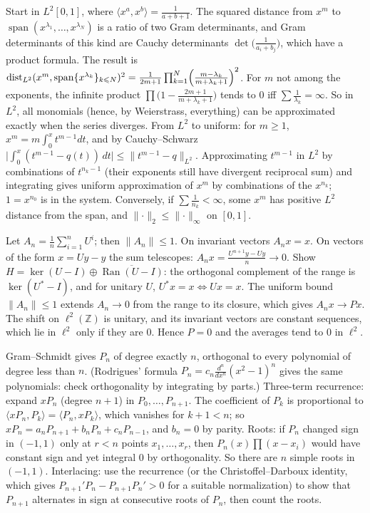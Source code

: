 \documentclass[11pt,a4paper]{article}
\begin{document}
Start in \(L^2[0,1]\), where \(\langle x^a,x^b\rangle=\frac1{a+b+1}\). The squared distance from \(x^m\) to \(\operatorname{span}(x^{\lambda_1},\dots,x^{\lambda_N})\) is a ratio of two Gram determinants, and Gram determinants of this kind are Cauchy determinants \(\det\bigl(\frac1{a_i+b_j}\bigr)\), which have a product formula.
The result is \(\operatorname{dist}_{L^2}(x^m,\operatorname{span}\{x^{\lambda_k}\}_{k\le N})^2=\frac1{2m+1}\prod_{k=1}^N\Bigl(\frac{m-\lambda_k}{m+\lambda_k+1}\Bigr)^2\). For \(m\) not among the exponents, the infinite product \(\prod\bigl(1-\frac{2m+1}{m+\lambda_k+1}\bigr)\) tends to \(0\) iff \(\sum\frac1{\lambda_k}=\infty\). So in \(L^2\), all monomials (hence, by Weierstrass, everything) can be approximated exactly when the series diverges.
From \(L^2\) to uniform: for \(m\ge1\), \(x^m=m\int_0^xt^{m-1}dt\), and by Cauchy--Schwarz \(\bigl\lvert\int_0^x(t^{m-1}-q(t))\,dt\bigr\rvert\le\lVert t^{m-1}-q\rVert_{L^2}\). Approximating \(t^{m-1}\) in \(L^2\) by combinations of \(t^{n_k-1}\) (their exponents still have divergent reciprocal sum) and integrating gives uniform approximation of \(x^m\) by combinations of the \(x^{n_k}\); \(1=x^{n_0}\) is in the system. Conversely, if \(\sum\frac1{n_k}\lt\infty\), some \(x^m\) has positive \(L^2\) distance from the span, and \(\lVert\cdot\rVert_2\le\lVert\cdot\rVert_\infty\) on \([0,1]\).

Let \(A_n=\frac1n\sum_{i=1}^nU^i\); then \(\lVert A_n\rVert\le1\). On invariant vectors \(A_nx=x\). On vectors of the form \(x=Uy-y\) the sum telescopes: \(A_nx=\frac{U^{n+1}y-Uy}n\to0\).
Show \(H=\ker(U-I)\oplus\overline{\operatorname{Ran}(U-I)}\): the orthogonal complement of the range is \(\ker(U^*-I)\), and for unitary \(U\), \(U^*x=x\iff Ux=x\). The uniform bound \(\lVert A_n\rVert\le1\) extends \(A_n\to0\) from the range to its closure, which gives \(A_nx\to Px\).
The shift on \(\ell^2(\mathbb Z)\) is unitary, and its invariant vectors are constant sequences, which lie in \(\ell^2\) only if they are \(0\). Hence \(P=0\) and the averages tend to \(0\) in \(\ell^2\).

Gram--Schmidt gives \(P_n\) of degree exactly \(n\), orthogonal to every polynomial of degree less than \(n\). (Rodrigues' formula \(P_n=c_n\frac{d^n}{dx^n}(x^2-1)^n\) gives the same polynomials: check orthogonality by integrating by parts.)
Three-term recurrence: expand \(xP_n\) (degree \(n+1\)) in \(P_0,\dots,P_{n+1}\). The coefficient of \(P_k\) is proportional to \(\langle xP_n,P_k\rangle=\langle P_n,xP_k\rangle\), which vanishes for \(k+1\lt n\); so \(xP_n=a_nP_{n+1}+b_nP_n+c_nP_{n-1}\), and \(b_n=0\) by parity.
Roots: if \(P_n\) changed sign in \((-1,1)\) only at \(r\lt n\) points \(x_1,\dots,x_r\), then \(P_n(x)\prod(x-x_i)\) would have constant sign and yet integral \(0\) by orthogonality. So there are \(n\) simple roots in \((-1,1)\). Interlacing: use the recurrence (or the Christoffel--Darboux identity, which gives \(P_{n+1}'P_n-P_{n+1}P_n'\gt0\) for a suitable normalization) to show that \(P_{n+1}\) alternates in sign at consecutive roots of \(P_n\), then count the roots.
\end{document}
